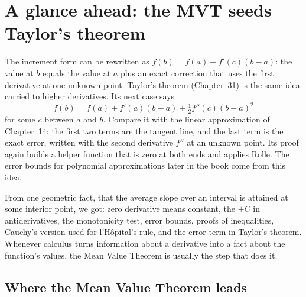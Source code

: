 \section{A glance ahead: the MVT seeds Taylor's theorem}

The increment form can be rewritten as $f(b)=f(a)+f'(c)(b-a)$: the value at $b$
equals the value at $a$ plus an exact correction that uses the first derivative at
one unknown point. Taylor's theorem (Chapter~31) is the same idea carried to higher
derivatives. Its next case says
\[
  f(b)=f(a)+f'(a)(b-a)+\tfrac12 f''(c)(b-a)^2
\]
for some $c$ between $a$ and $b$. Compare it with the linear approximation of
Chapter~14: the first two terms are the tangent line, and the last term is the
exact error, written with the second derivative $f''$ at an unknown point. Its proof
again builds a helper function that is zero at both ends and applies Rolle. The error
bounds for polynomial approximations later in the book come from this idea.

\begin{aestheticbox}
From one geometric fact, that the average slope over an interval is attained at
some interior point, we got: zero derivative means constant, the $+C$ in
antiderivatives, the monotonicity test, error bounds, proofs of inequalities,
Cauchy's version used for l'H\^opital's rule, and the error term in Taylor's theorem.
Whenever calculus turns information about a derivative into a fact about the
function's values, the Mean Value Theorem is usually the step that does it.
\end{aestheticbox}

\subsection{Where the Mean Value Theorem leads}
\label{ch15:what-unlocked}


